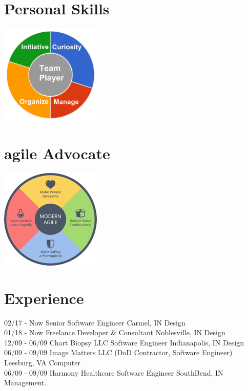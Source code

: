 \documentclass[]{friggeri-cv}
\begin{document}
\begin{aside}
  \section{Personal Skills}
    \includegraphics[scale=0.62]{img/personal.png}
    ~
 \section{agile Advocate}
 \includegraphics[scale=0.62]{img/agile.png}
\end{aside}

\section{Experience}
\begin{entrylist}
  \entry
    {02/17 - Now}
    {Senior Software Engineer}
    {Carmel, IN}
    {Design \\}
  \entry
    {01/18 - Now}
    {Freelance Developer \& Consultant}
    {Noblesville, IN}
    {Design \\}
    \entry
    {12/09 - 06/09}
    {Chart Biopsy LLC Software Engineer}
    {Indianapolis, IN}
    {Design\\}
    \entry
    {06/09 - 09/09}
    {Image Matters LLC (DoD Contractor, Software Engineer)}
    {Leesburg, VA}
    {Computer\\}
    \entry
    {06/09 - 09/09}
    {Harmony Healthcare Software Engineer}
    {SouthBend, IN}
    {Management.}
\end{entrylist}
\end{document}
